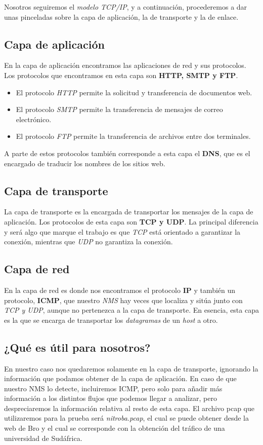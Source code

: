 \noindent Nosotros seguiremos el \textit{modelo TCP/IP}, y a continuación, procederemos a dar 
unas pinceladas sobre la capa de aplicación, la de transporte y la de enlace.

\subsection{Capa de aplicación}

En la capa de aplicación encontramos las aplicaciones de red y sus protocolos. 
Los protocolos que encontramos en esta capa son \textbf{HTTP, SMTP y FTP}. 
\intro
\begin{itemize}
\item El protocolo \textit{HTTP} permite la solicitud y transferencia de documentos web.
\item El protocolo \textit{SMTP} permite la transferencia de mensajes de correo electrónico.
\item El protocolo \textit{FTP} permite la transferencia de archivos entre dos terminales.
\end{itemize}

\noindent A parte de estos protocolos también corresponde a esta capa el \textbf{DNS}, 
que es el encargado de traducir los nombres de los sitios web.

\subsection{Capa de transporte}

La capa de transporte es la encargada de transportar los mensajes de la capa de aplicación. 
Los protocolos de esta capa son \textbf{TCP y UDP}. La principal diferencia y será algo que 
marque el trabajo es que \textit{TCP} está orientado a garantizar la conexión, mientras que \textit{UDP} no 
garantiza la conexión.

\subsection{Capa de red}

En la capa de red es donde nos encontramos el protocolo \textbf{IP} y también 
un protocolo, \textbf{ICMP}, que nuestro \textit{NMS} hay veces que localiza y 
sitúa junto con \textit{TCP y UDP}, aunque no pertenezca a la capa de transporte.
\intro
En esencia, esta capa es la que se encarga de transportar los \textit{datagramas} 
de un \textit{host} a otro.

\subsection{¿Qué es útil para nosotros?}

En nuestro caso nos quedaremos solamente en la capa de transporte, 
ignorando la información que podamos obtener de la capa 
de aplicación. En caso de que nuestro NMS lo detecte, incluiremos ICMP, 
pero solo para añadir más 
información a los distintos flujos que podemos llegar a analizar, 
pero despreciaremos la información relativa al resto de esta capa. 
El archivo pcap que utilizaremos para la prueba será \textit{nitroba.pcap}, 
el cual se puede obtener desde la web de Bro y el cual se corresponde con 
la obtención del tráfico de una universidad de Sudáfrica.
